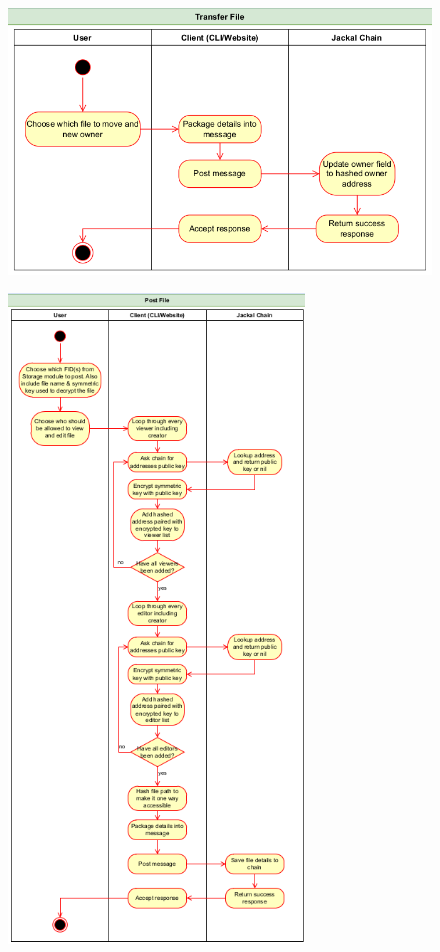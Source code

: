 \documentclass[a4paper]{article}
\begin{document}
\begin{figure}[!htbp]
\centering
\includegraphics[width=1\textwidth]{assets/filetree9.png}
\caption{}
\end{figure}

\begin{figure}[!htbp]
\centering
\includegraphics[width=0.7\textwidth]{assets/filetree3.png}
\caption{}
\end{figure}
\end{document}
